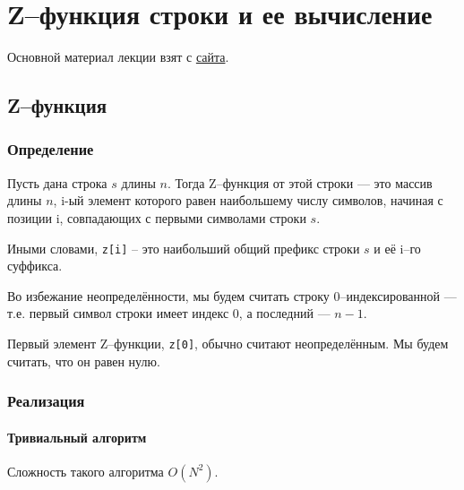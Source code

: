 \chapter{Z--функция строки и ее вычисление}
Основной материал лекции взят с \href{http://e-maxx.ru/algo/z_function}{сайта}.
\section{Z--функция}
\subsection{Определение}
Пусть дана строка $s$ длины $n$. Тогда Z--функция от этой строки --- это массив длины $n$, i-ый элемент которого равен наибольшему числу символов, начиная с позиции i, совпадающих с первыми символами строки $s$.

Иными словами, \texttt{z[i]} -- это наибольший общий префикс строки $s$ и её i--го суффикса.

Во избежание неопределённости, мы будем считать строку 0--индексированной --- т.е. первый символ строки имеет индекс 0, а последний --- $n-1$.

Первый элемент Z--функции, \texttt{z[0]}, обычно считают неопределённым. Мы будем считать, что он равен нулю.

\subsection{Реализация}
\subsubsection{Тривиальный алгоритм}
Сложность такого алгоритма $O(N^2)$. 

